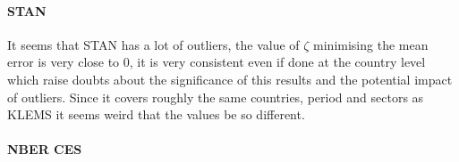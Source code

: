 \paragraph{STAN}

It seems that STAN has a lot of outliers, the value of $\zeta$ minimising the mean error is very close to 0, it is very consistent even if done at the country level which raise doubts about the significance of this results and the potential impact of outliers. Since it covers roughly the same countries, period and sectors as KLEMS it seems weird that the values be so different. 


\paragraph{NBER CES}





